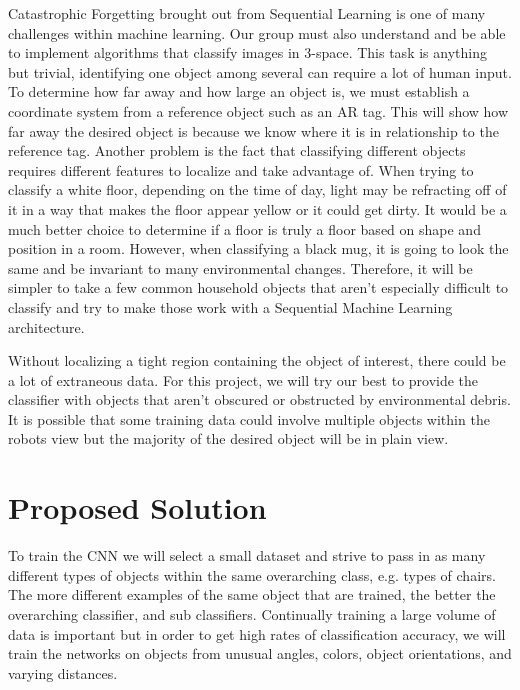 \documentclass[a4paper, 10pt]{article}
\begin{document}
Catastrophic Forgetting brought out from Sequential Learning is one of many challenges within machine learning. Our group must also understand and be able to implement algorithms that classify images in 3-space. This task is anything but trivial, identifying one object among several can require a lot of human input. To determine how far away and how large an object is, we must establish a coordinate system from a reference object such as an AR tag. This will show how far away the desired object is because we know where it is in relationship to the reference tag. Another problem is the fact that classifying different objects requires different features to localize and take advantage of. When trying to classify a white floor, depending on the time of day, light may be refracting off of it in a way that makes the floor appear yellow or it could get dirty. It would be a much better choice to determine if a floor is truly a floor based on shape and position in a room. However, when classifying a black mug, it is going to look the same and be invariant to many environmental changes. Therefore, it will be simpler to take a few common household objects that aren't especially difficult to classify and try to make those work with a Sequential Machine Learning architecture.

Without localizing a tight region containing the object of interest, there could be a lot of extraneous data. For this project, we will try our best to provide the classifier with objects that aren't obscured or obstructed by environmental debris. It is possible that some training data could involve multiple objects within the robots view but the majority of the desired object will be in plain view.


\section{Proposed Solution}
To train the CNN we will select a small dataset and strive to pass in as many different types of objects within the same overarching class, e.g. types of chairs. The more different examples of the same object that are trained, the better the overarching classifier, and sub classifiers. Continually training a large volume of data is important but in order to get high rates of classification accuracy, we will train the networks on objects from unusual angles, colors, object orientations, and varying distances.
\end{document}
